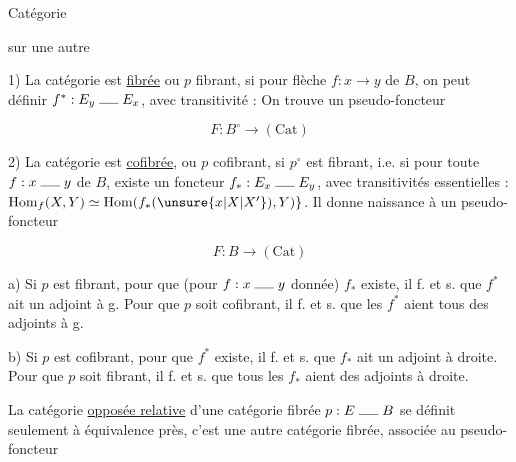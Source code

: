 
Catégorie


sur une autre

1) La catégorie est \uline{fibrée} ou $p$ fibrant, si pour  flèche $f:x\longrightarrow y$ de $B$, on peut définir $f^*:E_y\mathrel{\rule{1.4em}{.35pt}}E_x$, avec transitivité  :
On trouve un pseudo-foncteur

\[ F:B^\circ\longrightarrow(\mathrm{Cat}) \]

2) La catégorie est \uline{cofibrée}, ou $p$ cofibrant, si $p^\circ$ est fibrant, i.e. si pour toute $f:x\mathrel{\rule{1.4em}{.35pt}}y$ de $B$, existe un foncteur $f_*:E_x\mathrel{\rule{1.4em}{.35pt}}E_y$, avec transitivités essentielles : $\operatorname{Hom}_f(X,Y)\simeq\operatorname{Hom}(f_*(\unsure{x|X|X'}),Y)\rbrace$. Il donne naissance à un pseudo-foncteur

\[ F:B\longrightarrow(\mathrm{Cat}) \]

\uline{} a) Si $p$ est fibrant, pour que (pour $f:x\mathrel{\rule{1.4em}{.35pt}}y$ donnée) $f_*$ existe, il f. et s. que $f^*$ ait un adjoint à g. Pour que $p$ soit cofibrant, il f. et s. que les $f^*$ aient tous des adjoints à g.

b) Si $p$ est cofibrant, pour que $f^*$ existe, il f. et s. que $f_*$ ait un adjoint à droite. Pour que $p$ soit fibrant, il f. et s. que tous les $f_*$ aient des adjoints à droite.

La catégorie \uline{opposée relative} d'une catégorie fibrée $p:E\mathrel{\rule{1.4em}{.35pt}}B$ se définit seulement à équivalence près, c'est une autre catégorie fibrée, associée au pseudo-foncteur

